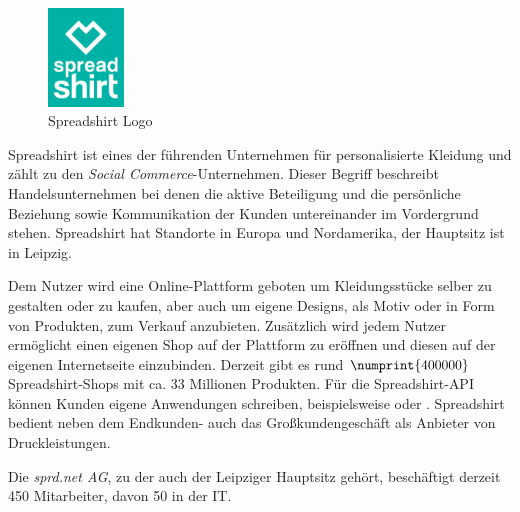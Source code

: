 
\begin{figure}[!htb]
	\centering
		\includegraphics[width=2cm]{resources/sprd_logo_screen_rgb}
	\caption{Spreadshirt Logo}
	\label{fig:spreadshirtLogo}
\end{figure}

Spreadshirt ist eines der führenden Unternehmen für personalisierte Kleidung und zählt zu den \emph{Social Commerce}-Unternehmen. Dieser Begriff beschreibt Handelsunternehmen bei denen die aktive Beteiligung und die persönliche Beziehung sowie Kommunikation der Kunden untereinander im Vordergrund stehen. 
Spreadshirt hat Standorte in Europa und Nordamerika, der Hauptsitz ist in Leipzig. 

Dem Nutzer wird eine Online-Plattform geboten um Kleidungsstücke selber zu gestalten oder zu kaufen, aber auch um eigene Designs, als Motiv oder in Form von Produkten, zum Verkauf anzubieten. 
Zusätzlich wird jedem Nutzer ermöglicht einen eigenen Shop auf der Plattform zu eröffnen und diesen auf der eigenen Internetseite einzubinden. Derzeit gibt es rund $\numprint{400000}$ 
Spreadshirt-Shops mit ca. 33 Millionen %
Produkten.
Für die Spreadshirt-\gls{API} können Kunden eigene Anwendungen schreiben, beispielsweise  \cite{zufallsshirt} oder  \cite{soundslikecotton}.
Spreadshirt bedient neben dem Endkunden- auch das Großkundengeschäft als Anbieter von Druckleistungen.

Die \emph{sprd.net AG}, zu der auch der Leipziger Hauptsitz gehört, beschäftigt derzeit 450 Mitarbeiter, davon 50 in der IT. %